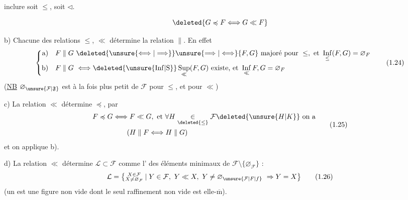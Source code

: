 inclure soit $\leq$, soit $\triangleleft$.

\[
\deleted{G\preccurlyeq F\Longleftrightarrow G\ll F}
\]

b) Chacune des relations $\leq$, $\ll$ détermine la relation $\parallel$. En effet
\[
\left\{\begin{aligned}
\text{a)}\quad F\parallel G &\ \deleted{\unsure{\Longleftrightarrow|\Longrightarrow}}\unsure{\Longrightarrow|\Longleftrightarrow}
 \{F,G\}\ \text{majoré pour }\leq,\ \text{et }\mathop{\mathrm{Inf}}\limits_{\leq}(F,G)=\varnothing_F\\
\text{b)}\quad F\parallel G &\ \Longleftrightarrow
 \deleted{\unsure{\mathrm{Inf}|\mathrm{S}}}\mathop{\mathrm{Sup}}\limits_{\ll}(F,G)\ \text{existe, et }\mathop{\mathrm{Inf}}\limits_{\ll} F,G=\varnothing_F
\end{aligned}\right.
\tag*{(1.24)}
\]
(\uline{NB} $\varnothing_{\unsure{\mathcal{F}|\mathfrak{F}}}$ est à la fois plus petit  de $\mathcal{F}$ pour $\leq$, et pour $\ll$)

c) La relation $\ll$ détermine $\preccurlyeq$, par
\margin{$\times$}
\[
\begin{aligned}
F\preccurlyeq G &\Longleftrightarrow F\ll G,\ \text{et }\forall H\underset{\deleted{\leq}}{\in}\mathcal{F}\deleted{\unsure{H|K}}\ \text{on a}\\
&\hspace{2em}(H\parallel F\Longleftrightarrow H\parallel G)
\end{aligned}
\tag*{(1.25)}
\]
et on applique b).

d) La relation $\ll$ détermine $\mathcal{L}\subset\mathcal{F}$ comme l' des éléments minimaux de $\mathcal{F}\setminus\{\varnothing_{\mathcal{F}}\}$ :
\[
\mathcal{L}=\bigl\{\substack{X\in\mathcal{F}\\ X\neq\varnothing_{\mathcal{F}}}\mid
 Y\in\mathcal{F},\ Y\ll X,\ Y\neq\varnothing_{\unsure{\mathcal{F}|F|f}}\ \Rightarrow Y=X\bigr\} \tag*{(1.26)}
\]
(un  est une figure non vide dont le seul raffinement non vide est elle-$\overline{\mathrm m}$).

